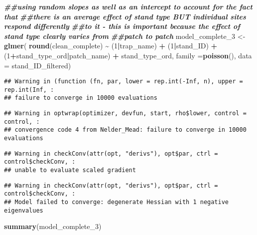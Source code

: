 \documentclass[
]{article}
\newenvironment{Shaded}{\begin{snugshade}}{\end{snugshade}}
\newcommand{\AttributeTok}[1]{\textcolor[rgb]{0.13,0.29,0.53}{#1}}
\newcommand{\DecValTok}[1]{\textcolor[rgb]{0.00,0.00,0.81}{#1}}
\newcommand{\DocumentationTok}[1]{\textcolor[rgb]{0.56,0.35,0.01}{\textbf{\textit{#1}}}}
\newcommand{\FunctionTok}[1]{\textcolor[rgb]{0.13,0.29,0.53}{\textbf{#1}}}
\newcommand{\NormalTok}[1]{#1}
\newcommand{\OtherTok}[1]{\textcolor[rgb]{0.56,0.35,0.01}{#1}}
\newcommand{\SpecialCharTok}[1]{\textcolor[rgb]{0.81,0.36,0.00}{\textbf{#1}}}
\begin{document}
\begin{Shaded}
\begin{Highlighting}[]
\DocumentationTok{\#\#using random slopes as well as an intercept to account for the fact that }
\DocumentationTok{\#\#there is an average effect of stand type BUT individual sites respond differently}
\DocumentationTok{\#\#to it {-} this is important because the effect of stand type clearly varies from}
\DocumentationTok{\#\#patch to patch}
\NormalTok{model\_complete\_3 }\OtherTok{\textless{}{-}} \FunctionTok{glmer}\NormalTok{(}
  \FunctionTok{round}\NormalTok{(clean\_complete) }\SpecialCharTok{\textasciitilde{}}\NormalTok{ (}\DecValTok{1}\SpecialCharTok{|}\NormalTok{trap\_name) }\SpecialCharTok{+}\NormalTok{ (}\DecValTok{1}\SpecialCharTok{|}\NormalTok{stand\_ID) }\SpecialCharTok{+} 
\NormalTok{    (}\DecValTok{1}\SpecialCharTok{+}\NormalTok{stand\_type\_ord}\SpecialCharTok{|}\NormalTok{patch\_name) }\SpecialCharTok{+}\NormalTok{ stand\_type\_ord, }
  \AttributeTok{family =}\FunctionTok{poisson}\NormalTok{(), }\AttributeTok{data =}\NormalTok{ stand\_ID\_filtered)}
\end{Highlighting}
\end{Shaded}

\begin{verbatim}
## Warning in (function (fn, par, lower = rep.int(-Inf, n), upper = rep.int(Inf, :
## failure to converge in 10000 evaluations
\end{verbatim}

\begin{verbatim}
## Warning in optwrap(optimizer, devfun, start, rho$lower, control = control, :
## convergence code 4 from Nelder_Mead: failure to converge in 10000 evaluations
\end{verbatim}

\begin{verbatim}
## Warning in checkConv(attr(opt, "derivs"), opt$par, ctrl = control$checkConv, :
## unable to evaluate scaled gradient
\end{verbatim}

\begin{verbatim}
## Warning in checkConv(attr(opt, "derivs"), opt$par, ctrl = control$checkConv, :
## Model failed to converge: degenerate Hessian with 1 negative eigenvalues
\end{verbatim}

\begin{Shaded}
\begin{Highlighting}[]
\FunctionTok{summary}\NormalTok{(model\_complete\_3)}
\end{Highlighting}
\end{Shaded}
\end{document}
